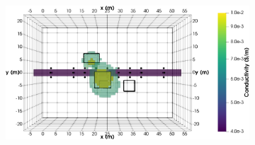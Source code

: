 \documentclass[preprint,authoryear,12pt]{elsarticle}
\begin{document}
\begin{figure}[htp]{}
\begin{center}
\begin{subfigure}{0.55\linewidth}
      \end{subfigure}
      \hspace{-4.0cm}
      \qquad
      \begin{subfigure}{0.55\linewidth}
         \label{fig:MultiBlk_StraightTunnel_RxSelection_10mBlk_DataDiff10Perc_10RxPerTx_Top_2ISO}
         \includegraphics[trim=0cm 0cm 0cm 0cm, clip=true,width=\linewidth]{./figures/Fig24d.png}
      \end{subfigure}
      \vspace{0.2cm}


\end{center}
\end{figure}
\end{document}
